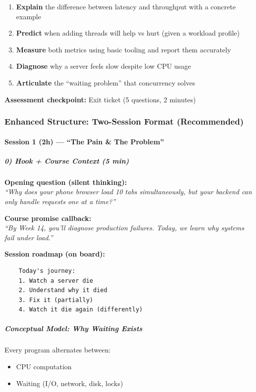 \documentclass[11pt,a4paper]{article}
\begin{document}
\begin{enumerate}[leftmargin=*]
	\item \textbf{Explain} the difference between latency and throughput with a concrete example
	\item \textbf{Predict} when adding threads will help vs hurt (given a workload profile)
	\item \textbf{Measure} both metrics using basic tooling and report them accurately
	\item \textbf{Diagnose} why a server feels slow despite low CPU usage
	\item \textbf{Articulate} the ``waiting problem'' that concurrency solves
\end{enumerate}

\textbf{Assessment checkpoint:} Exit ticket (5 questions, 2 minutes)

\subsubsection*{Enhanced Structure: Two-Session Format (Recommended)}

\paragraph{Session 1 (2h) --- ``The Pain \& The Problem''}

\subparagraph{0) Hook + Course Context (5 min)}
\textbf{Opening question (silent thinking):}\\
\textit{``Why does your phone browser load 10 tabs simultaneously, but your backend can only handle requests one at a time?''}

\textbf{Course promise callback:}\\
\textit{``By Week 14, you'll diagnose production failures. Today, we learn why systems fail under load.''}

\textbf{Session roadmap (on board):}
\begin{verbatim}
	Today's journey:
	1. Watch a server die
	2. Understand why it died
	3. Fix it (partially)
	4. Watch it die again (differently)
\end{verbatim}

\subparagraph{Conceptual Model: Why Waiting Exists}

Every program alternates between:

\begin{itemize}
	\item CPU computation
	\item Waiting (I/O, network, disk, locks)
\end{itemize}
\end{document}
